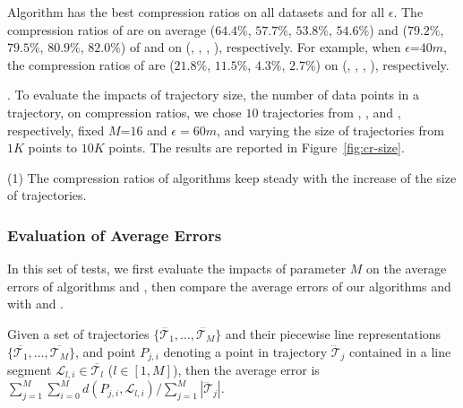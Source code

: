  Algorithm \cista has {the best} compression ratios on all datasets and for all $\epsilon$.
%
The compression ratios of \cista are on average ($64.4\%$, $57.7\%$, $53.8\%$, {$54.6\%$}) and ($79.2\%$, $79.5\%$, $80.9\%$, $82.0\%$) of \squishe and \dps on (\truck, \sercar, \geolife, \pricar), respectively.
%
For example, when $\epsilon$=$40m$, the compression ratios of \cista are ($21.8\%$, $11.5\%$, $4.3\%$, $2.7\%$) on (\truck, \sercar, \geolife, \pricar), respectively.



.
To evaluate the impacts of trajectory size, \ie the number of data points in a trajectory, on compression ratios,
we chose {$10$} trajectories from \truck, \sercar, \geolife and \pricar, respectively,
fixed {$M$=$16$} and $\epsilon = 60m$, and varying the size  of trajectories from $1K$ points to $10K$ points.
%
The results are reported in Figure~\ref{fig:cr-size}.

\ni(1) The compression ratios of \lsa algorithms keep steady with the increase of the size of trajectories.





\subsubsection{Evaluation of Average Errors}
In this set of tests, we first evaluate the impacts of parameter $M$ on the average errors of algorithms \cist and \cista, then compare the average errors of our algorithms \cist and \cista with \dps and \squishe.

Given a set of trajectories $\{\dddot{\mathcal{T}_1}, \ldots, \dddot{\mathcal{T}_M}\}$ and their piecewise line representations $\{\overline{\mathcal{T}_1}, \ldots, \overline{\mathcal{T}_M}\}$, and point $P_{j,i}$ denoting
a point in trajectory $\dddot{\mathcal{T}}_j$ contained in a line segment $\mathcal{L}_{l,i}\in\overline{\mathcal{T}_l}$ ($l\in[1,M]$),
then the average error is $\sum_{j=1}^{M}\sum_{i=0}^{M} d(P_{j,i},
\mathcal{L}_{l,i})/\sum_{j=1}^{M}{|\dddot{\mathcal{T}}_j |}$.




